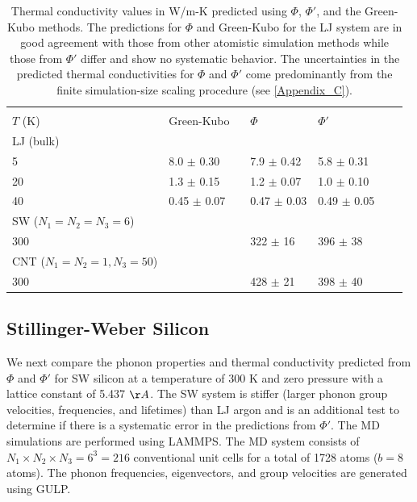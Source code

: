 \documentclass[12pt,twocolumn,iop]{/usr/share/texmf-texlive/tex/latex/iop/iopart}[/usr/share/texmf-texlive/tex/latex/iop/]
\begin{document}
\begin{center}
\begin{table}
\caption{\label{T:cond_table}Thermal conductivity values in W/m-K predicted using $\Phi$, $\Phi'$, and the Green-Kubo methods.  The predictions for $\Phi$ and Green-Kubo for the LJ system are in good agreement with those from other atomistic simulation methods\cite{turney2009a} while those from $\Phi'$ differ and show no systematic behavior. The uncertainties in the predicted thermal conductivities for $\Phi$ and $\Phi'$ come predominantly from the finite simulation-size scaling procedure (see \ref{Appendix_C}).}
\begin{ruledtabular}
\begin{tabular}{llllll}
     &                             &         &      &   \\
$T$ (K)&Green-Kubo \ &$\Phi$ &$\Phi'$\\
\hline
LJ (bulk)\\
5&8.0 $\pm$ 0.30 &7.9 $\pm$ 0.42 &5.8 $\pm$ 0.31 \\
20&1.3 $\pm$ 0.15 &1.2 $\pm$ 0.07 &1.0 $\pm$ 0.10 \\
40&0.45 $\pm$ 0.07 &0.47 $\pm$ 0.03 &0.49 $\pm$ 0.05 \\
\hline
SW ($N_1=N_2=N_3=6$) \\
300& &322 $\pm$ 16 &396 $\pm$ 38 \\
\hline
CNT ($N_1=N_2=1, N_3=50$) \\
300& &428 $\pm$ 21 &398 $\pm$ 40 \\
\end{tabular}
\end{ruledtabular}
\end{table}
\end{center}

\vspace*{70mm}

\subsection{\label{S:Subsection_prop_SW}Stillinger-Weber Silicon}

We next compare the phonon properties and thermal conductivity predicted from $\Phi$ and $\Phi'$ for SW silicon \cite{stillinger1985} at a temperature of $300$ K and zero pressure with a lattice constant of 5.437 $\AA$. The SW system is stiffer (larger phonon group velocities, frequencies, and lifetimes) than LJ argon and is an additional test to determine if there is a systematic error in the predictions from $\Phi'$. The MD simulations are performed using LAMMPS.\cite{LAMMPS} The MD system consists
of $N_1 \times N_2 \times N_3 = 6^3 = 216$ conventional unit cells for a total of 1728 atoms ($b=8$ atoms). The phonon frequencies, eigenvectors, and group velocities are generated using GULP.\cite{GULP}
\end{document}
